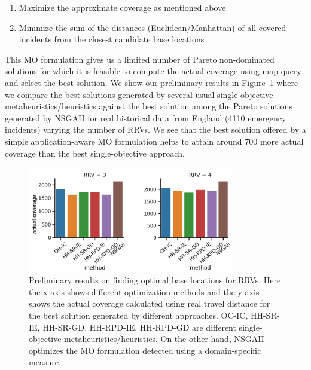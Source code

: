 \begin{enumerate}[label=$F_\arabic*$)]
	\item Maximize the approximate coverage as mentioned above
	\item Minimize the sum of the distances (Euclidean/Manhattan) of all covered incidents from the closest candidate base locations
\end{enumerate}

This MO formulation gives us a limited number of Pareto non-dominated solutions for which it is feasible to compute the actual coverage using map query and select the best solution. We show our preliminary results in Figure~\ref{fig:rrv-results} where we compare the best solutions generated by several usual single-objective metaheuristics/heuristics against the best solution among the Pareto solutions generated by NSGAII for real historical data from England (4110 emergency incidents) varying the number of RRVs. We see that the best solution offered by a simple application-aware MO formulation helps to attain around 700 more actual coverage than the best single-objective approach.

\begin{figure}[!htbp]
	\centering
	
	\includegraphics[width=0.8\textwidth]{Figure/rrv-results}
	\caption[Preliminary results on finding optimal base locations for RRVs]{Preliminary results on finding optimal base locations for RRVs. Here the x-axis shows different optimization methods and the y-axis shows the actual coverage calculated using real travel distance for the best solution generated by different approaches. OC-IC, HH-SR-IE, HH-SR-GD, HH-RPD-IE, HH-RPD-GD are different single-objective metaheuristics/heuristics. On the other hand, NSGAII optimizes the MO formulation detected using a domain-specific measure.}
	
	\label{fig:rrv-results}
	
\end{figure}

